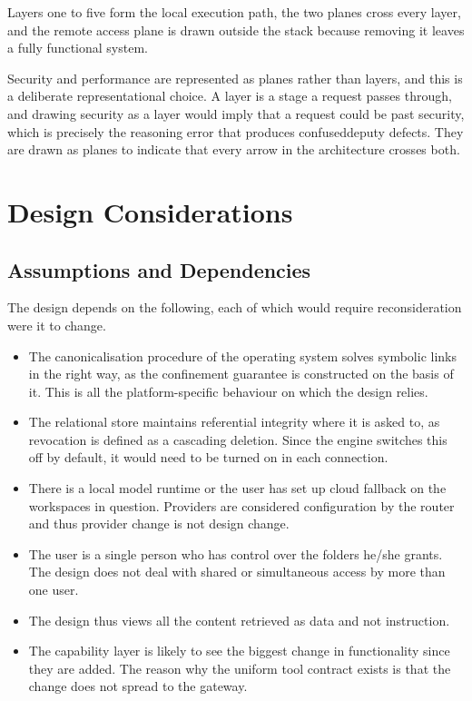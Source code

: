 \documentclass{FastFyp}
\begin{document}
Layers one to five form the local execution path, the two planes cross every layer, and the remote access plane is drawn outside the stack because removing it leaves a fully functional system.

Security and performance are represented as planes rather than layers, and this is a deliberate representational choice. A layer is a stage a request passes through, and drawing security as a layer would imply that a request could be past security, which is precisely the reasoning error that produces confuseddeputy defects. They are drawn as planes to indicate that every arrow in the architecture crosses both.


\section{Design Considerations}
\subsection{Assumptions and Dependencies}
The design depends on the following, each of which would require reconsideration were it to change.

\begin{itemize}
    \item The canonicalisation procedure of the operating system solves symbolic links in the right way, as the confinement guarantee is constructed on the basis of it. This is all the platform-specific behaviour on which the design relies.
    \item The relational store maintains referential integrity where it is asked to, as revocation is defined as a cascading deletion. Since the engine switches this off by default, it would need to be turned on in each connection.
    \item There is a local model runtime or the user has set up cloud fallback on the workspaces in question. Providers are considered configuration by the router and thus provider change is not design change.
    \item The user is a single person who has control over the folders he/she grants. The design does not deal with shared or simultaneous access by more than one user.
    \item The design thus views all the content retrieved as data and not instruction.
    \item The capability layer is likely to see the biggest change in functionality since they are added. The reason why the uniform tool contract exists is that the change does not spread to the gateway.
\end{itemize}
\end{document}
